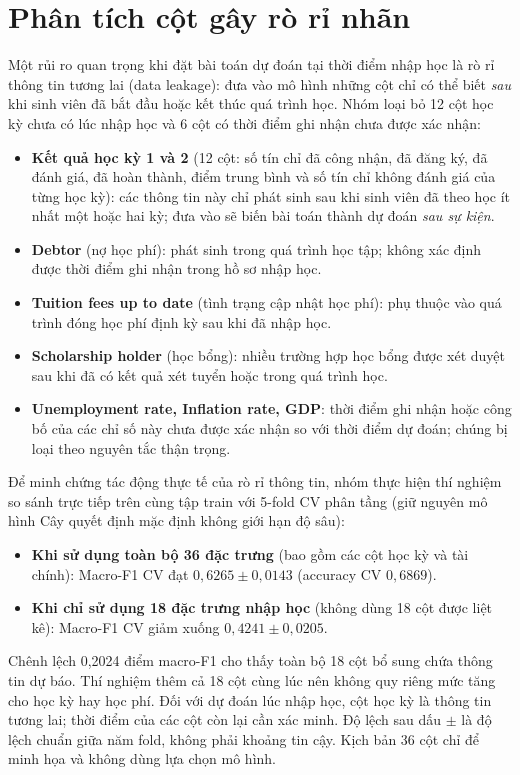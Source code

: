 \section{Phân tích cột gây rò rỉ nhãn}\label{sec:leakage}
Một rủi ro quan trọng khi đặt bài toán dự đoán tại thời điểm nhập học là rò rỉ thông tin tương lai (data leakage): đưa vào mô hình những cột chỉ có thể biết \emph{sau} khi sinh viên đã bắt đầu hoặc kết thúc quá trình học. Nhóm loại bỏ 12 cột học kỳ chưa có lúc nhập học và 6 cột có thời điểm ghi nhận chưa được xác nhận:

\begin{itemize}
  \item \textbf{Kết quả học kỳ 1 và 2} (12 cột: số tín chỉ đã công nhận, đã đăng ký, đã đánh giá, đã hoàn thành, điểm trung bình và số tín chỉ không đánh giá của từng học kỳ): các thông tin này chỉ phát sinh sau khi sinh viên đã theo học ít nhất một hoặc hai kỳ; đưa vào sẽ biến bài toán thành dự đoán \emph{sau sự kiện}.
  \item \textbf{Debtor} (nợ học phí): phát sinh trong quá trình học tập; không xác định được thời điểm ghi nhận trong hồ sơ nhập học.
  \item \textbf{Tuition fees up to date} (tình trạng cập nhật học phí): phụ thuộc vào quá trình đóng học phí định kỳ sau khi đã nhập học.
  \item \textbf{Scholarship holder} (học bổng): nhiều trường hợp học bổng được xét duyệt sau khi đã có kết quả xét tuyển hoặc trong quá trình học.
  \item \textbf{Unemployment rate, Inflation rate, GDP}: thời điểm ghi nhận hoặc công bố của các chỉ số này chưa được xác nhận so với thời điểm dự đoán; chúng bị loại theo nguyên tắc thận trọng.
\end{itemize}

Để minh chứng tác động thực tế của rò rỉ thông tin, nhóm thực hiện thí nghiệm so sánh trực tiếp trên cùng tập train với 5-fold CV phân tầng (giữ nguyên mô hình Cây quyết định mặc định không giới hạn độ sâu):
\begin{itemize}
  \item \textbf{Khi sử dụng toàn bộ 36 đặc trưng} (bao gồm các cột học kỳ và tài chính): Macro-F1 CV đạt $0{,}6265 \pm 0{,}0143$ (accuracy CV $0{,}6869$).
  \item \textbf{Khi chỉ sử dụng 18 đặc trưng nhập học} (không dùng 18 cột được liệt kê): Macro-F1 CV giảm xuống $0{,}4241 \pm 0{,}0205$.
\end{itemize}
Chênh lệch 0,2024 điểm macro-F1 cho thấy toàn bộ 18 cột bổ sung chứa thông tin dự báo. Thí nghiệm thêm cả 18 cột cùng lúc nên không quy riêng mức tăng cho học kỳ hay học phí. Đối với dự đoán lúc nhập học, cột học kỳ là thông tin tương lai; thời điểm của các cột còn lại cần xác minh. Độ lệch sau dấu $\pm$ là độ lệch chuẩn giữa năm fold, không phải khoảng tin cậy. Kịch bản 36 cột chỉ để minh họa và không dùng lựa chọn mô hình.

